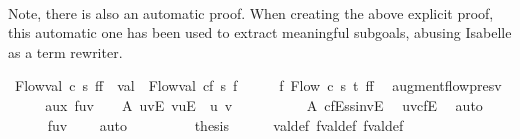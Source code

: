 \begin{isabellebody}
\ \ \isanewline
{}\isamarkupfalse%
%
\endisatagproof
{\isafoldproof}%
%
\isadelimproof
%
\endisadelimproof
%
\begin{isamarkuptxt}%
Note, there is also an automatic proof. When creating the above 
    explicit proof, this automatic one has been used to extract meaningful
    subgoals, abusing Isabelle as a term rewriter.%
\end{isamarkuptxt}\isamarkuptrue%
\isamarkupfalse%
\ {\isachardoublequoteopen}Flow{\isachardot}val\ c\ s\ {\isacharparenleft}f{\isasymup}f{\isacharprime}{\isacharparenright}\ {\isacharequal}\ val\ {\isacharplus}\ Flow{\isachardot}val\ cf\ s\ f{\isacharprime}{\isachardoublequoteclose}\isanewline
%
\isadelimproof
%
\endisadelimproof
%
\isatagproof
{}\isamarkupfalse%
\ {\isacharminus}\isanewline
\ \ \isamarkupfalse%
\ f{\isacharprime}{\isacharprime}{\isacharcolon}\ Flow\ c\ s\ t\ {\isachardoublequoteopen}f{\isasymup}f{\isacharprime}{\isachardoublequoteclose}\ \isamarkupfalse%
\ augment{\isacharunderscore}flow{\isacharunderscore}presv\ \isacommand{{\isachardot}}\isamarkupfalse%
\ \isanewline
\isanewline
\ \ \isamarkupfalse%
\ aux{}{\isacharcolon}\ {\isachardoublequoteopen}f{\isacharprime}{\isacharparenleft}u{\isacharcomma}v{\isacharparenright}\ {\isacharequal}\ {}{\isachardoublequoteclose}\ \ A{\isacharcolon}\ {\isachardoublequoteopen}{\isacharparenleft}u{\isacharcomma}v{\isacharparenright}{\isasymnotin}E{\isachardoublequoteclose}\ {\isachardoublequoteopen}{\isacharparenleft}v{\isacharcomma}u{\isacharparenright}{\isasymnotin}E{\isachardoublequoteclose}\ \ u\ v\isanewline
\ \ \isamarkupfalse%
\ {\isacharminus}\isanewline
\ \ \ \ \isamarkupfalse%
\ A\ cfE{\isacharunderscore}ss{\isacharunderscore}invE\ \isamarkupfalse%
\ {\isachardoublequoteopen}{\isacharparenleft}u{\isacharcomma}v{\isacharparenright}{\isasymnotin}cf{\isachardot}E{\isachardoublequoteclose}\ \isamarkupfalse%
\ auto\isanewline
\ \ \ \ \isamarkupfalse%
\ {\isachardoublequoteopen}f{\isacharprime}{\isacharparenleft}u{\isacharcomma}v{\isacharparenright}\ {\isacharequal}\ {}{\isachardoublequoteclose}\ \isamarkupfalse%
\ auto\isanewline
\ \ \isamarkupfalse%
\ \ \isanewline
\isanewline
\ \ \isamarkupfalse%
\ {\isacharquery}thesis\isanewline
\ \ \ \ \isamarkupfalse%
\ val{\isacharunderscore}def\ f{\isacharprime}{\isachardot}val{\isacharunderscore}def\ f{\isacharprime}{\isacharprime}{\isachardot}val{\isacharunderscore}def\isanewline

\end{isabellebody}
